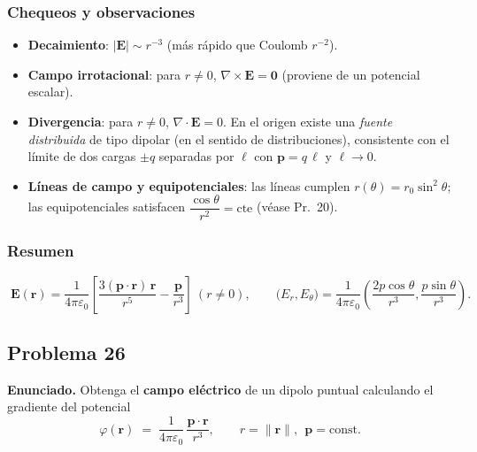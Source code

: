\documentclass{article}
\begin{document}
\subsubsection*{Chequeos y observaciones}
\begin{itemize}
\item \textbf{Decaimiento}: $|\mathbf E|\sim r^{-3}$ (más rápido que Coulomb $r^{-2}$).
\item \textbf{Campo irrotacional}: para $r\neq 0$, $\nabla\times\mathbf E=\mathbf 0$ (proviene de un potencial escalar).
\item \textbf{Divergencia}: para $r\neq 0$, $\nabla\!\cdot\!\mathbf E=0$. En el origen existe una \emph{fuente distribuida} de tipo dipolar (en el sentido de distribuciones), consistente con el límite de dos cargas $\pm q$ separadas por $\boldsymbol\ell$ con $\mathbf p=q\,\boldsymbol\ell$ y $\boldsymbol\ell\to 0$.
\item \textbf{Líneas de campo y equipotenciales}: las líneas cumplen $r(\theta)=r_0\sin^2\theta$; las equipotenciales satisfacen $\dfrac{\cos\theta}{r^2}=\text{cte}$ (véase Pr.~20).
\end{itemize}

\subsubsection*{Resumen}
\[
\boxed{\;
\mathbf E(\mathbf r)=\frac{1}{4\pi\varepsilon_0}\left[
\frac{3(\mathbf p\!\cdot\!\mathbf r)\,\mathbf r}{r^{5}}-\frac{\mathbf p}{r^{3}}
\right]\ (r\neq 0),\qquad
\big(E_r,E_\theta\big)=\frac{1}{4\pi\varepsilon_0}\left(\frac{2p\cos\theta}{r^{3}},\frac{p\sin\theta}{r^{3}}\right).}
\]

\subsection{Problema 26} \vspace{0.5cm}

\textbf{Enunciado.} \; Obtenga el \textbf{campo eléctrico} de un dipolo puntual calculando el gradiente del potencial
\[
\varphi(\mathbf r) \;=\; \frac{1}{4\pi\varepsilon_0}\,\frac{\mathbf p\!\cdot\!\mathbf r}{r^{3}},
\qquad r=\lVert\mathbf r\rVert,\ \ \mathbf p=\text{const.}
\]

\end{document}
